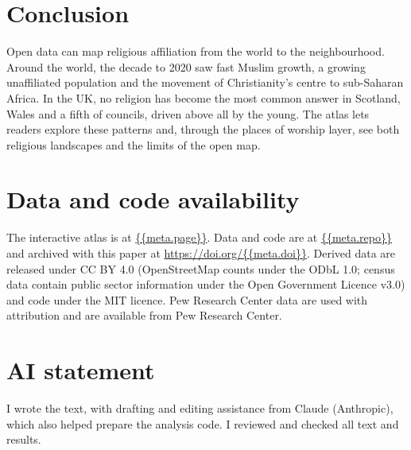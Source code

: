 \documentclass[11pt,a4paper]{article}
\begin{document}
\section{Conclusion}
Open data can map religious affiliation from the world to the neighbourhood. Around the world, the decade to 2020 saw fast Muslim growth, a growing unaffiliated population and the movement of Christianity's centre to sub-Saharan Africa. In the UK, no religion has become the most common answer in Scotland, Wales and a fifth of councils, driven above all by the young. The atlas lets readers explore these patterns and, through the places of worship layer, see both religious landscapes and the limits of the open map.

\section*{Data and code availability}
The interactive atlas is at \url{{{meta.page}}}. Data and code are at \url{{{meta.repo}}} and archived with this paper at \url{https://doi.org/{{meta.doi}}}. Derived data are released under CC BY 4.0 (OpenStreetMap counts under the ODbL 1.0; census data contain public sector information under the Open Government Licence v3.0) and code under the MIT licence. Pew Research Center data are used with attribution and are available from Pew Research Center.

\section*{AI statement}
I wrote the text, with drafting and editing assistance from Claude (Anthropic), which also helped prepare the analysis code. I reviewed and checked all text and results.
\end{document}
